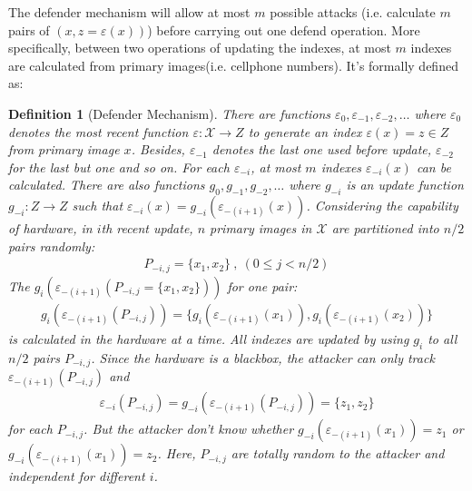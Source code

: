 \documentclass[10pt, conference, compsocconf]{IEEEtran}
\newtheorem{mydef}{Definition}
\begin{document}
        The defender mechanism will allow at most $m$ possible
        attacks (i.e. calculate $m$ pairs of $\left(x, z = \varepsilon(x)\right)$)
        before carrying out one defend operation. More specifically, between
        two operations of updating the indexes,
        at most $m$ indexes are calculated from primary images(i.e. cellphone numbers).
        It's formally defined as:
        \begin{mydef}[Defender Mechanism]
            There are functions $\varepsilon_0, \varepsilon_{-1}, \varepsilon_{-2}, \ldots$ where
            $\varepsilon_0$ denotes the most recent function $\varepsilon: \mathcal{X} \rightarrow Z$
            to generate an index $\varepsilon(x) = z \in Z$ from primary image $x$.
            Besides, $\varepsilon_{-1}$ denotes the last one used before update, $\varepsilon_{-2}$
            for the last but one and so on.
            For each $\varepsilon_{-i}$, at most $m$ indexes $\varepsilon_{-i}(x)$ can be calculated.
            There are also functions $g_0, g_{-1}, g_{-2}, \ldots$ where
            $g_{-i}$ is an update function $g_{-i}: Z \rightarrow Z$ such that
            $\varepsilon_{-i}(x) = g_{-i}\left(\varepsilon_{-(i+1)}(x) \right)$. Considering the capability of hardware,
            in $i$th recent update,
            $n$ primary images in $\mathcal X$ are partitioned into $n/2$ pairs randomly:
            \begin{align*}
                P_{-i, j} = \{x_1, x_2\} ~, ~ (0 \leq j < n/2)
            \end{align*}
            The $g_i\left(\varepsilon_{-(i+1)}(P_{-i, j} = \{x_1, x_2\})\right)$ for one pair:
            \begin{align*}
                g_i\left(\varepsilon_{-(i+1)}(P_{-i, j})\right) = \{ g_i\left(\varepsilon_{-(i+1)}(x_1)\right),
                    g_i\left(\varepsilon_{-(i+1)}(x_2)\right) \}
            \end{align*}
            is
            calculated in the hardware at a time. All indexes are updated by using
            $g_i$ to all $n/2$ pairs $P_{-i, j}$.
            Since the hardware is a blackbox, the attacker can only track
            $\varepsilon_{-(i+1)}(P_{-i, j})$ and
            \begin{align*}
                \varepsilon_{-i}(P_{-i, j}) = g_{-i}\left( \varepsilon_{-(i+1)}(P_{-i, j}) \right) = \{z_1, z_2\}
            \end{align*}
            for each $P_{-i, j}$.
            But the attacker don't know whether $g_{-i}(\varepsilon_{-(i+1)}(x_1)) = z_1$ or
            $g_{-i}(\varepsilon_{-(i+1)}(x_1)) = z_2$.
            Here, $P_{-i, j}$ are totally random
            to the attacker and independent for different $i$.
        \end{mydef}
\end{document}
